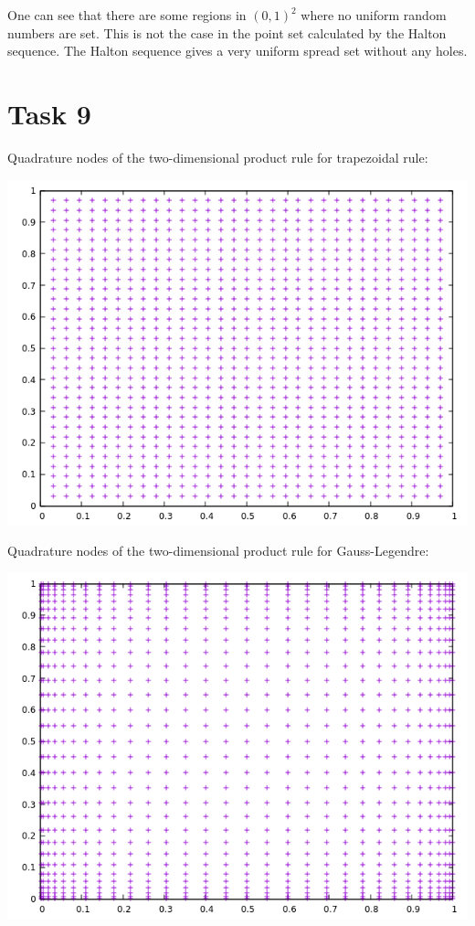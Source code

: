 \documentclass[10pt,a4paper]{article}
\begin{document}
One can see that there are some regions in $(0,1)^2$ where no uniform random numbers are set. This is not the case in the point set calculated by the Halton sequence. The Halton sequence gives a very uniform spread set without any holes.

\section*{Task 9}

Quadrature nodes of the two-dimensional product rule for trapezoidal rule:
\begin{center}
\includegraphics[scale=0.5]{quadrature_nodes_trapezoidal_rule.png}		
\end{center}

Quadrature nodes of the two-dimensional product rule for Gauss-Legendre:
\begin{center}
\includegraphics[scale=0.5]{quadrature_nodes_gauss_legendre.png}		
\end{center}
\end{document}
